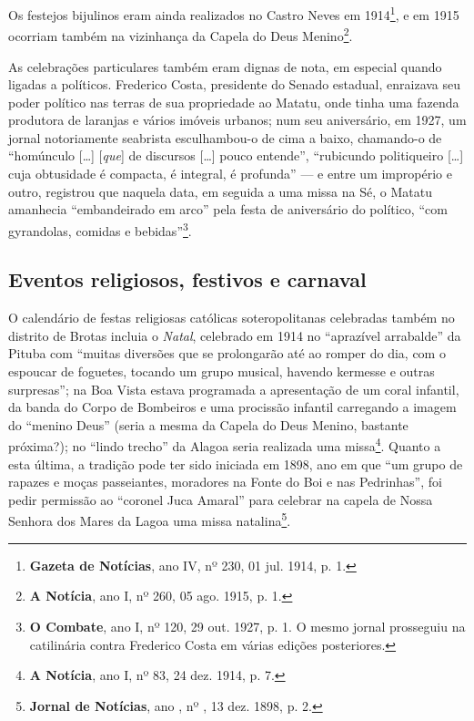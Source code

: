 Os festejos bijulinos eram ainda realizados no Castro Neves em 1914\footnote{\textbf{Gazeta de Notícias}, ano IV, nº 230, 01 jul. 1914, p. 1.}, e em 1915 ocorriam também na vizinhança da Capela do Deus Menino\footnote{\textbf{A Notícia}, ano I, nº 260, 05 ago. 1915, p. 1.}.

As celebrações particulares também eram dignas de nota, em especial quando ligadas a políticos. Frederico Costa, presidente do Senado estadual, enraizava seu poder político nas terras de sua propriedade ao Matatu, onde tinha uma fazenda produtora de laranjas e vários imóveis urbanos; num seu aniversário, em 1927, um jornal notoriamente seabrista esculhambou-o de cima a baixo, chamando-o de ``homúnculo [\dots] [\textit{que}] de discursos [\dots] pouco entende'', ``rubicundo politiqueiro [\dots] cuja obtusidade é compacta, é integral, é profunda'' --- e entre um impropério e outro, registrou que naquela data, em seguida a uma missa na Sé, o Matatu amanhecia ``embandeirado em arco'' pela festa de aniversário do político, ``com gyrandolas, comidas e bebidas''\footnote{\textbf{O Combate}, ano I, nº 120, 29 out. 1927, p. 1. O mesmo jornal prosseguiu na catilinária contra Frederico Costa em várias edições posteriores.}.

\subsection{Eventos religiosos, festivos e carnaval}

O calendário de festas religiosas católicas soteropolitanas celebradas também no distrito de Brotas incluia o \textit{Natal}, celebrado em 1914 no ``aprazível arrabalde'' da Pituba com ``muitas diversões que se prolongarão até ao romper do dia, com o espoucar de foguetes, tocando um grupo musical, havendo kermesse e outras surpresas''; na Boa Vista estava programada a apresentação de um coral infantil, da banda do Corpo de Bombeiros e uma procissão infantil carregando a imagem do ``menino Deus'' (seria a mesma da Capela do Deus Menino, bastante próxima?); no ``lindo trecho'' da Alagoa seria realizada uma missa\footnote{\textbf{A Notícia}, ano I, nº 83, 24 dez. 1914, p. 7.}. Quanto a esta última, a tradição pode ter sido iniciada em 1898, ano em que ``um grupo de rapazes e moças passeiantes, moradores na Fonte do Boi e nas Pedrinhas'', foi pedir permissão ao ``coronel Juca Amaral'' para celebrar na capela de Nossa Senhora dos Mares da Lagoa uma missa natalina\footnote{\textbf{Jornal de Notícias}, ano , nº , 13 dez. 1898, p. 2.}.

